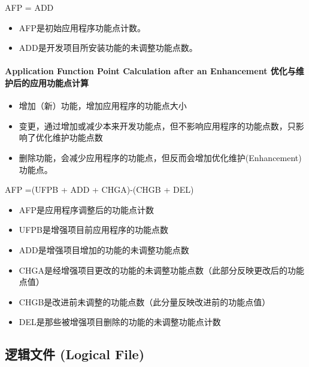 \documentclass{book}        %
\providecommand{\tightlist}{%
  \setlength{\itemsep}{0pt}\setlength{\parskip}{0pt}}
\let\oldparagraph\paragraph
\renewcommand{\paragraph}[1]{\oldparagraph{#1}\mbox{}}
\begin{document}
AFP = ADD

\begin{itemize}
\tightlist
\item
  AFP是初始应用程序功能点计数。
\item
  ADD是开发项目所安装功能的未调整功能点数。
\end{itemize}

\hypertarget{application-function-point-calculation-after-an-enhancement-ux4f18ux5316ux4e0eux7ef4ux62a4ux540eux7684ux5e94ux7528ux529fux80fdux70b9ux8ba1ux7b97}{%
\paragraph{Application Function Point Calculation after an Enhancement
优化与维护后的应用功能点计算}\label{application-function-point-calculation-after-an-enhancement-ux4f18ux5316ux4e0eux7ef4ux62a4ux540eux7684ux5e94ux7528ux529fux80fdux70b9ux8ba1ux7b97}}

\begin{itemize}
\tightlist
\item
  增加（新）功能，增加应用程序的功能点大小
\item
  变更，通过增加或减少本来开发功能点，但不影响应用程序的功能点数，只影响了优化维护功能点数
\item
  删除功能，会减少应用程序的功能点，但反而会增加优化维护(Enhancement)功能点。
\end{itemize}

AFP =(UFPB + ADD + CHGA)-(CHGB + DEL)

\begin{itemize}
\tightlist
\item
  AFP是应用程序调整后的功能点计数
\item
  UFPB是增强项目前应用程序的功能点数
\item
  ADD是增强项目增加的功能的未调整功能点数
\item
  CHGA是经增强项目更改的功能的未调整功能点数（此部分反映更改后的功能点值）
\item
  CHGB是改进前未调整的功能点数（此分量反映改进前的功能点值）
\item
  DEL是那些被增强项目删除的功能的未调整功能点计数
\end{itemize}

\hypertarget{ux903bux8f91ux6587ux4ef6-logical-file}{%
\subsection{逻辑文件 (Logical
File)}\label{ux903bux8f91ux6587ux4ef6-logical-file}}
\end{document}
